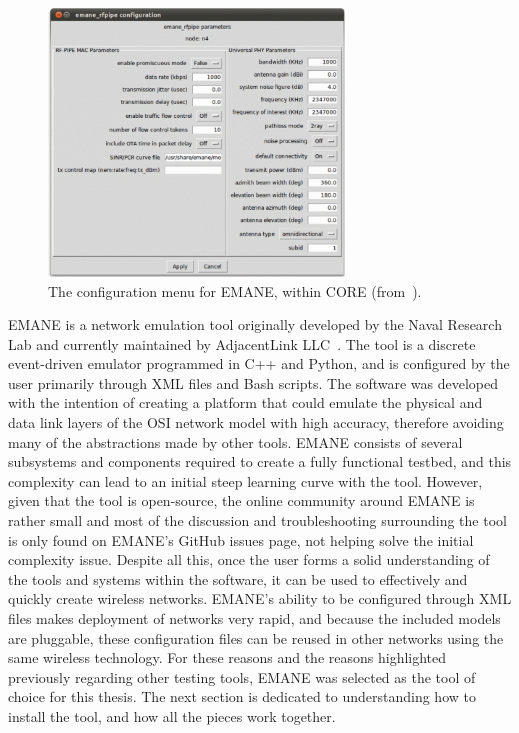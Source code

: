 \begin{figure}[!ht]
    \centering
    \includegraphics[width=0.7\textwidth,keepaspectratio]{Images/Chpt2/core_emane.png}
    \caption{The configuration menu for EMANE, within CORE (from~\cite{emane_core}).}
    \label{core_emane}
\end{figure}

EMANE is a network emulation tool originally developed by the Naval Research Lab and currently maintained by AdjacentLink LLC~\cite{emane_nrl}.
The tool is a discrete event-driven emulator programmed in C++ and Python, and is configured by the user primarily through XML files and Bash scripts.
The software was developed with the intention of creating a platform that could emulate the physical and data link layers of the OSI network model with high accuracy, therefore avoiding many of the abstractions made by other tools.
EMANE consists of several subsystems and components required to create a fully functional testbed, and this complexity can lead to an initial steep learning curve with the tool.
However, given that the tool is open-source, the online community around EMANE is rather small and most of the discussion and troubleshooting surrounding the tool is only found on EMANE's GitHub issues page, not helping solve the initial complexity issue.
Despite all this, once the user forms a solid understanding of the tools and systems within the software, it can be used to effectively and quickly create wireless networks.
EMANE's ability to be configured through XML files makes deployment of networks very rapid, and because the included models are pluggable, these configuration files can be reused in other networks using the same wireless technology.
For these reasons and the reasons highlighted previously regarding other testing tools, EMANE was selected as the tool of choice for this thesis.
The next section is dedicated to understanding how to install the tool, and how all the pieces work together.\par

